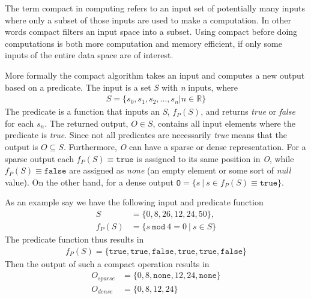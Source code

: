 The term compact in computing refers to an input set of potentially many inputs where only a subset of those inputs are used to make a computation.
In other words compact filters an input space into a subset.
Using compact before doing computations is both more computation and memory efficient, if only some inputs of the entire data space are of interest.

More formally the compact algorithm takes an input and computes a new output based on a predicate.
The input is a set \textit{S} with \textit{n} inputs, where 
\begin{gather}
	S=\{s_{0}, s_{1}, s_{2}, ... , s_{n}|n\in \mathbb{R}\}
\end{gather}
The predicate is a function that inputs an \textit{S}, $f_{P}(S)$, and returns \textit{true} or \textit{false} for each $s_n$.
The returned output, $O\in S$, contains all input elements where the predicate is \textit{true}. 
Since not all predicates are necessarily \textit{true} means that the output is $O\subseteq S$.
Furthermore, \textit{O} can have a sparse or dense representation.
For a sparse output each $f_{P}(S)\equiv \mathtt{true}$ is assigned to its same position in \textit{O}, while $f_{P}(S)\equiv \mathtt{false}$ are assigned as \textit{none} (an empty element or some sort of \textit{null} value).
On the other hand, for a dense output $\mathtt{O}=\{s\ |\ s\in f_{P}(S)\equiv \mathtt{true}\}$.

As an example say we have the following input and predicate function
\begin{align}
	       S &= \{0, 8, 26, 12, 24, 50\}, \\
	f_{P}(S) &= \{s\ \mathtt{mod}\ 4 = 0\ |\ s\in S\}
\end{align}
The predicate function thus results in
\begin{gather}
	f_{P}(S)=\{\mathtt{true}, \mathtt{true}, \mathtt{false}, \mathtt{true}, \mathtt{true}, \mathtt{false}\}
\end{gather}
Then the output of such a compact operation results in
\begin{align}
	O_{sparse} &= \{0, 8, \mathtt{none}, 12, 24, \mathtt{none}\}\\
	O_{dense} &= \{0, 8, 12, 24\}
\end{align}


